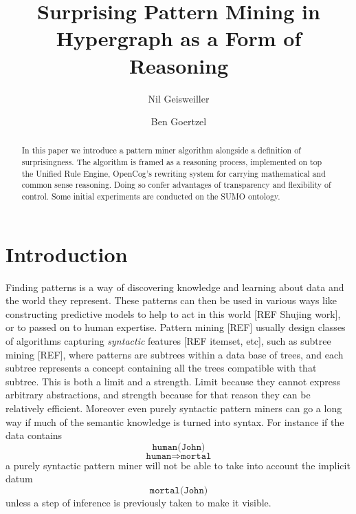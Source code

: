 \documentclass[runningheads]{llncs}
\begin{document}
%
\title{Surprising Pattern Mining in Hypergraph as a Form of Reasoning}
%
%
\author{Nil Geisweiller \and
Ben Goertzel}
%
%
%
\maketitle              %
%

\begin{abstract}
  In this paper we introduce a pattern miner algorithm alongside a
  definition of surprisingness. The algorithm is framed as a reasoning
  process, implemented on top the Unified Rule Engine, OpenCog's
  rewriting system for carrying mathematical and common sense
  reasoning. Doing so confer advantages of transparency and
  flexibility of control. Some initial experiments are conducted on
  the SUMO ontology.  
\end{abstract}

\section{Introduction}

Finding patterns is a way of discovering knowledge and learning about
data and the world they represent. These patterns can then be used in
various ways like constructing predictive models to help to act in
this world [REF Shujing work], or to passed on to human
expertise. Pattern mining [REF] usually design classes of algorithms
capturing \emph{syntactic} features [REF itemset, etc], such as
subtree mining [REF], where patterns are subtrees within a data base
of trees, and each subtree represents a concept containing all the
trees compatible with that subtree. This is both a limit and a
strength. Limit because they cannot express arbitrary abstractions,
and strength because for that reason they can be relatively
efficient. Moreover even purely syntactic pattern miners can go a long
way if much of the semantic knowledge is turned into syntax. For
instance if the data contains
$$\texttt{human(John)}$$
$$\texttt{human}\Rightarrow\texttt{mortal}$$ a purely syntactic
pattern miner will not be able to take into account the implicit
datum $$\texttt{mortal(John)}$$ unless a step of inference is
previously taken to make it visible.
\end{document}
